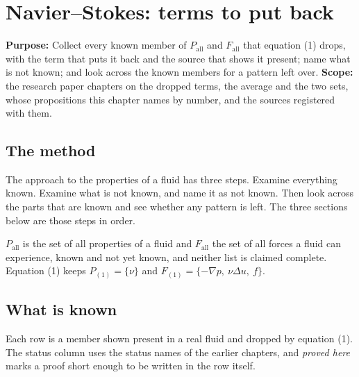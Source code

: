 \chapter{Navier--Stokes: terms to put back}

\textbf{Purpose:} Collect every known member of $P_{\mathrm{all}}$ and $F_{\mathrm{all}}$ that
equation (1) drops, with the term that puts it back and the source that shows it present; name what
is not known; and look across the known members for a pattern left over. \textbf{Scope:} the
research paper chapters on the dropped terms, the average and the two sets, whose propositions this
chapter names by number, and the sources registered with them.

\section{The method}

The approach to the properties of a fluid has three steps. Examine everything known. Examine what
is not known, and name it as not known. Then look across the parts that are known and see whether
any pattern is left. The three sections below are those steps in order.

$P_{\mathrm{all}}$ is the set of all properties of a fluid and $F_{\mathrm{all}}$ the set of all
forces a fluid can experience, known and not yet known, and neither list is claimed complete.
Equation (1) keeps $P_{(1)} = \{\nu\}$ and $F_{(1)} = \{-\nabla p,\ \nu\Delta u,\ f\}$.

\section{What is known}

Each row is a member shown present in a real fluid and dropped by equation (1). The status column
uses the status names of the earlier chapters, and \emph{proved here} marks a proof short enough to be
written in the row itself.

